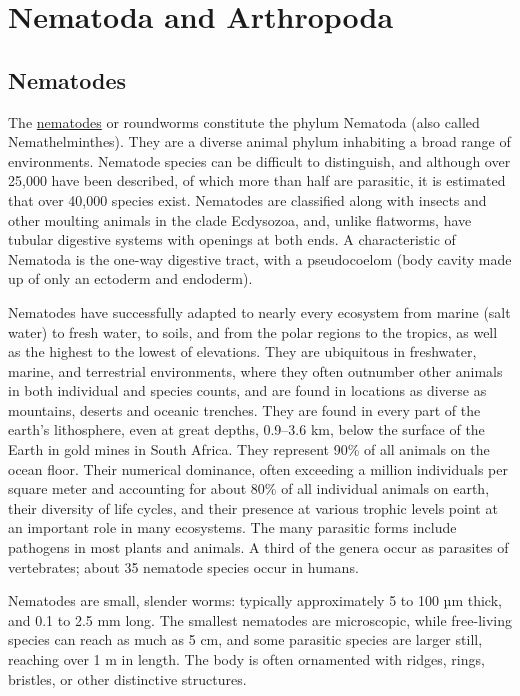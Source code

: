 \chapter{Nematoda and Arthropoda}\label{nematoda-and-arthropoda}

\section{Nematodes}\label{nematodes}

The \href{https://en.wikipedia.org/wiki/Nematode}{nematodes} or
roundworms constitute the phylum Nematoda (also called Nemathelminthes).
They are a diverse animal phylum inhabiting a broad range of
environments. Nematode species can be difficult to distinguish, and
although over 25,000 have been described, of which more than half are
parasitic, it is estimated that over 40,000 species exist. Nematodes are
classified along with insects and other moulting animals in the clade
Ecdysozoa, and, unlike flatworms, have tubular digestive systems with
openings at both ends. A characteristic of Nematoda is the one-way
digestive tract, with a pseudocoelom (body cavity made up of only an
ectoderm and endoderm).

Nematodes have successfully adapted to nearly every ecosystem from
marine (salt water) to fresh water, to soils, and from the polar regions
to the tropics, as well as the highest to the lowest of elevations. They
are ubiquitous in freshwater, marine, and terrestrial environments,
where they often outnumber other animals in both individual and species
counts, and are found in locations as diverse as mountains, deserts and
oceanic trenches. They are found in every part of the earth's
lithosphere, even at great depths, 0.9--3.6 km, below the surface of the
Earth in gold mines in South Africa. They represent 90\% of all animals
on the ocean floor. Their numerical dominance, often exceeding a million
individuals per square meter and accounting for about 80\% of all
individual animals on earth, their diversity of life cycles, and their
presence at various trophic levels point at an important role in many
ecosystems. The many parasitic forms include pathogens in most plants
and animals. A third of the genera occur as parasites of vertebrates;
about 35 nematode species occur in humans.

Nematodes are small, slender worms: typically approximately 5 to 100 µm
thick, and 0.1 to 2.5 mm long. The smallest nematodes are microscopic,
while free-living species can reach as much as 5 cm, and some parasitic
species are larger still, reaching over 1 m in length. The body is often
ornamented with ridges, rings, bristles, or other distinctive
structures.

